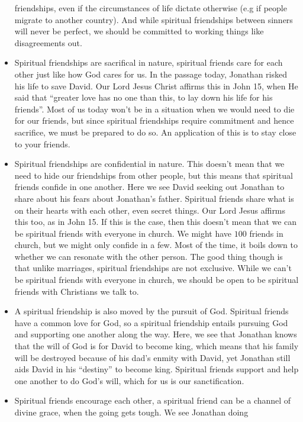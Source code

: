\begin{itemize}
{  friendships, even if the circumstances of life dictate otherwise (e.g if
  people migrate to another country).  And while spiritual friendships
  between sinners will never be perfect, we should be committed to working
  things like disagreements out.}
  \item{Spiritual friendships are sacrifical in nature, spiritual friends
  care for each other just like how God cares for us.  In the passage today,
  Jonathan risked his life to save David.  Our Lord Jesus Christ affirms this
  in John 15, when He said that ``greater love has no one than this, to lay
  down his life for his friends''.  Most of us today won't be in a situation
  when we would need to die for our friends, but since spiritual friendships
  require commitment and hence sacrifice, we must be prepared to do so.  An
  application of this is to stay close to your friends.}
  \item{Spiritual friendships are confidential in nature.  This doesn't mean
  that we need to hide our friendships from other people, but this means that
  spiritual friends confide in one another.  Here we see David seeking out
  Jonathan to share about his fears about Jonathan's father.  Spiritual
  friends share what is on their hearts with each other, even secret things.
  Our Lord Jesus affirms this too, as in John 15.  If this is the case, then
  this doesn't mean that we can be spiritual friends with everyone in church.
  We might have $100$ friends in church, but we might only confide in a few.
  Most of the time, it boils down to whether we can resonate with the other
  person.  The good thing though is that unlike marriages, spiritual
  friendships are not exclusive.  While we can't be spiritual friends with
  everyone in church, we should be open to be spiritual friends with
  Christians we talk to.}
  \item{A spiritual friendship is also moved by the pursuit of God.
  Spiritual friends have a common love for God, so a spiritual friendship
  entails pursuing God and supporting one another along the way.  Here, we
  see that Jonathan knows that the will of God is for David to become king,
  which means that his family will be destroyed because of his dad's enmity
  with David, yet Jonathan still aids David in his ``destiny'' to become
  king.  Spiritual friends support and help one another to do God's will,
  which for us is our sanctification.}
  \item{Spiritual friends encourage each other, a spiritual friend can be a
  channel of divine grace, when the going gets tough.  We see Jonathan doing
}
\end{itemize}
